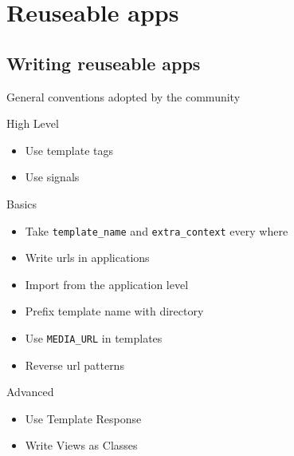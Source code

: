 \documentclass[19.9pt]{beamer}
\begin{document}
\section{Reuseable apps}
	\subsection{Writing reuseable apps}
		\begin{frame}
			General conventions adopted by the community
		\end{frame}
		\begin{frame}[<+-| alert@+>]
			{High Level}                                        
		\begin{itemize}                                                    \item
			Use template tags                                              \item
			Use signals                             
		\end{itemize}
		\end{frame}
		\begin{frame}[fragile]
			{Basics}                                                       
		\begin{itemize}[<+-| alert@+>]                                                    \item
			Take \verb|template_name| and \verb|extra_context| every where          \item
			Write urls in applications                                             \item
			Import from the application level                        \item
			Prefix template name with directory                      \item
			Use \verb|MEDIA_URL| in templates                        \item
			Reverse url patterns
		\end{itemize}
		\end{frame}
		\begin{frame}
			{Advanced}                              
		\begin{itemize}[<+-| alert@+>]                                                 
			\item
			Use Template Response                                           
			 \item
			Write Views as Classes
		\end{itemize}
		\end{frame}
		
\end{document}
